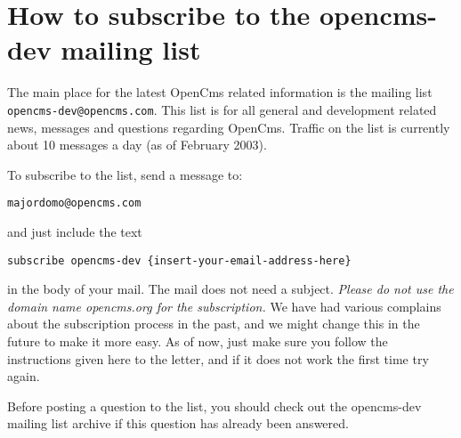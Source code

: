 \section{How to subscribe to the opencms-dev mailing list}
The main place for the latest OpenCms related information is the mailing list\\ {\tt opencms-dev@opencms.com}. 
This list is for all general and development related news, messages and questions regarding OpenCms.
Traffic on the list is currently about 10 messages a day (as of February 2003).

To subscribe to the list, send a message to:

{\tt majordomo@opencms.com}

and just include the text

{\tt subscribe opencms-dev \{insert-your-email-address-here\}}

in the body of your mail. The mail does not need a subject. 
{\em Please do not use the domain name opencms.org for the subscription.} We have had various complains about the 
subscription process in the past, and we might change this in the future to make it more easy. As of now, just 
make sure you follow the instructions given here to the letter, and if it does not work the first time try again.

Before posting a question to the list, you should check out the opencms-dev mailing list archive if this question 
has already been answered.
